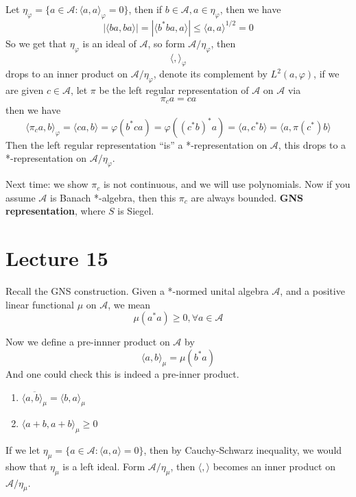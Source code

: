 Let $\eta_\varphi=\{a\in\mathcal{A}: \langle a, a\rangle_\varphi=0\} $, then if $b\in\mathcal{A}, a\in\eta_\varphi$, then we have
\begin{equation*}
    |\langle ba, ba\rangle|=|\langle b^*ba, a\rangle|\leq \langle a, a\rangle^{1/2}=0
\end{equation*}
So we get that $\eta_\varphi$ is an ideal of $\mathcal{A}$, so form $\mathcal{A}/\eta_\varphi$, then
\begin{equation*}
    \langle, \rangle_\varphi
\end{equation*}
drops to an inner product on $\mathcal{A}/\eta_\varphi$, denote its complement by $L^2(a,\varphi)$, if we are given $c\in\mathcal{A}$, let $\pi$ be the left regular representation of $\mathcal{A}$ on $\mathcal{A}$ via
\begin{equation*}
    \pi_ca=ca
\end{equation*}
then we have
\begin{equation*}
    \langle \pi_ca, b\rangle_\varphi=\langle ca, b\rangle=\varphi(b^*ca)=\varphi((c^*b)^*a)=\langle a, c^*b\rangle=\langle a, \pi(c^*)b\rangle
\end{equation*}
Then the left regular representation ``is'' a *-representation on $\mathcal{A}$, this drops to a *-representation on $\mathcal{A}/\eta_\varphi$.

Next time: we show $\pi_c$ is not continuous, and we will use polynomials. Now if you assume $\mathcal{A}$ is Banach *-algebra, then this $\pi_c$ are always bounded.
\textbf{GNS representation}, where $S$ is Siegel. 

\section{Lecture 15}
Recall the GNS construction. Given a *-normed unital algebra $\mathcal{A}$, and a positive linear functional $\mu$ on $\mathcal{A}$, we mean
\begin{equation*}
    \mu(a^*a)\geq 0, \forall a\in\mathcal{A}
\end{equation*}

Now we define a pre-innner product on $\mathcal{A}$ by
\begin{equation*}
    \langle a,b\rangle_\mu=\mu(b^*a)
\end{equation*}
And one could check this is indeed a pre-inner product.
\begin{enumerate}
    \item $\overline{\langle a,b\rangle_\mu}=\langle b,a\rangle_\mu$
    \item $\langle a+b, a+b\rangle_\mu\geq 0$
\end{enumerate}
If we let $\eta_\mu=\{a\in\mathcal{A}:\langle a,a\rangle=0\}$, then by Cauchy-Schwarz inequality, we would show that $\eta_\mu$ is a left ideal. Form $\mathcal{A}/\eta_\mu$, then $\langle, \rangle$ becomes an inner product on $\mathcal{A}/\eta_\mu$.

